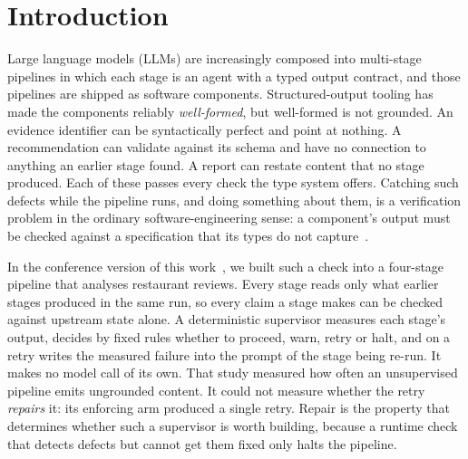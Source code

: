 \section{Introduction}
\label{sec:intro}

Large language models (LLMs) are increasingly composed into multi-stage
pipelines in which each stage is an agent with a typed output contract, and
those pipelines are shipped as software components. Structured-output tooling
has made the components reliably \emph{well-formed}, but well-formed is not
grounded. An evidence identifier can be syntactically perfect and point at
nothing. A recommendation can validate against its schema and have no
connection to anything an earlier stage found. A report can restate content
that no stage produced. Each of these passes every check the type system
offers. Catching such defects while the pipeline runs, and doing something
about them, is a verification problem in the ordinary software-engineering
sense: a component's output must be checked against a specification that its
types do not capture~\citep{leucker2009rv}.

In the conference version of this work~\citep{hoang2026eas}, we built such a
check into a four-stage pipeline that analyses restaurant reviews. Every stage
reads only what earlier stages produced in the same run, so every claim a stage
makes can be checked against upstream state alone. A deterministic supervisor
measures each stage's output, decides by fixed rules whether to proceed, warn,
retry or halt, and on a retry writes the measured failure into the prompt of
the stage being re-run. It makes no model call of its own. That study measured
how often an unsupervised pipeline emits ungrounded content. It could not
measure whether the retry \emph{repairs} it: its enforcing arm produced a single
retry. Repair is the property that determines whether such a supervisor is
worth building, because a runtime check that detects defects but cannot get
them fixed only halts the pipeline.

